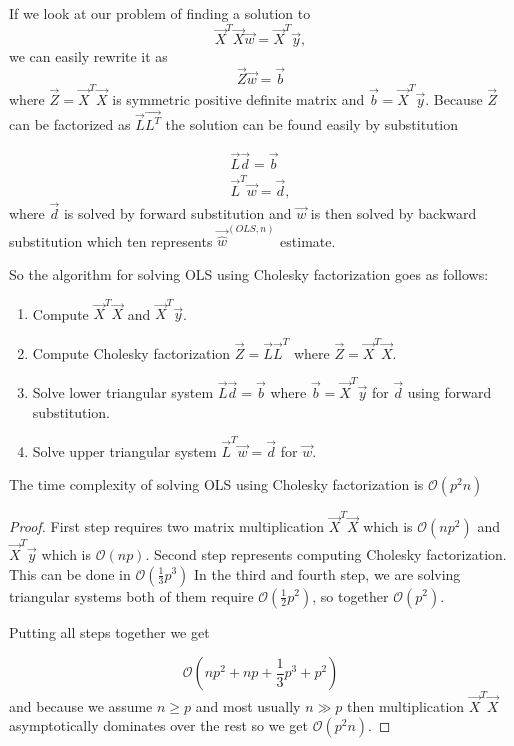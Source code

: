 If we look at our problem of finding a solution to 
\begin{equation}
    \vec{X}^T\vec{X}\vec{w} = \vec{X}^T\vec{y},
\end{equation}
we can easily rewrite it as 
\begin{equation}
    \vec{Z}\vec{w} = \vec{b}
\end{equation}
where $\vec{Z} = \vec{X}^T\vec{X}$ is symmetric positive definite matrix and $\vec{b} = \vec{X}^T\vec{y} $. Because $\vec{Z}$ can be factorized as $\vec{L}\vec{L^T}$ the solution can be found easily by substitution

\begin{align}
    \vec{L}\vec{d} = \vec{b} \\
    \vec{L}^T\vec{w} = \vec{d},
\end{align}
where $\vec{d}$ is solved by forward substitution and $\vec{w}$ is then solved by backward substitution which ten represents $\vec{\hat{w}}^{(OLS,n)}$ estimate.


So the algorithm for solving OLS using Cholesky factorization goes as follows:
\begin{enumerate}
  \item Compute $\vec{X}^T\vec{X}$ and   $\vec{X}^T\vec{y}$.
  \item Compute Cholesky factorization $\vec{Z} = \vec{L}\vec{L}^T$ where $\vec{Z} = \vec{X}^T\vec{X}$.
  \item Solve lower triangular system $\vec{L}\vec{d} = \vec{b}$  where $ \vec{b} = \vec{X}^T\vec{y}$  for $\vec{d}$ using forward substitution.
  \item Solve upper triangular system $ \vec{L}^T\vec{w} = \vec{d}$ for $\vec{w}$.
\end{enumerate}

\begin{observation} \label{time:complexity:ols:cholesky}
    The time complexity of solving OLS using Cholesky factorization is $\mathcal{O}(p^2n)$
\end{observation}

\begin{proof}
    First step requires two matrix multiplication $\vec{X}^T\vec{X}$ which is $\mathcal{O}(np^2)$ and  $\vec{X}^T\vec{y}$ which is $\mathcal{O}(np)$.
    Second step represents computing Cholesky factorization. This can be done in $\mathcal{O}(\frac{1}{3}p^3)$ \cite{krishnamoorthy2013matrix}
    In the third and fourth step, we are solving triangular systems both of them require  $\mathcal{O}(\frac{1}{2}p^2)$, so together $\mathcal{O}(p^2)$.

    Putting all steps together we get  

    \begin{equation} 
        \mathcal{O}(np^2 + np + \frac{1}{3}p^3 + p^2)
    \end{equation}
    and because we assume $n \geq p$ and most usually  $n \gg p$ then multiplication $\vec{X}^T\vec{X}$ asymptotically dominates over the rest so we get $\mathcal{O}(p^2n)$.
\end{proof}

